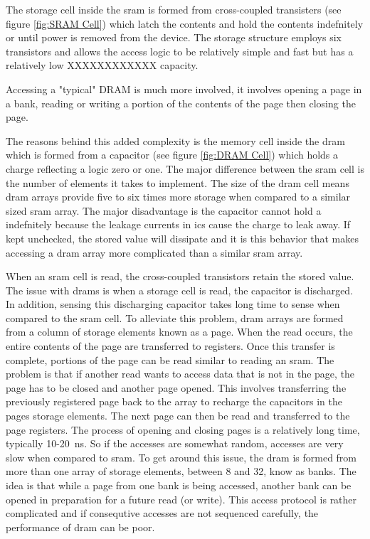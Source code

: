 The storage cell inside the \ac{sram} is formed from cross-coupled transisters (see figure \ref{fig:SRAM Cell}) which latch the contents and hold the contents indefnitely or until power is removed from the device.
The storage structure employs six transistors and allows the access logic to be relatively simple and fast but has a relatively low XXXXXXXXXXXX capacity.

Accessing a "typical" DRAM is much more involved, it involves opening a page in a bank, reading or writing a portion of the contents of the page then closing the page. 

The reasons behind this added complexity is the memory cell inside the \ac{dram} which is formed from a capacitor (see figure \ref{fig:DRAM Cell}) which holds a charge reflecting a logic zero or one. 
The major difference between the \ac{sram} cell is the number of elements it takes to implement. The size of the \ac{dram} cell means \ac{dram} arrays provide five to six times more storage when compared to a similar sized \ac{sram} array.
The major disadvantage is the capacitor cannot hold a indefnitely because the leakage currents in \acp{ic} cause the charge to leak away. If kept unchecked, the stored value will dissipate and it is this behavior that makes accessing a \ac{dram} array more complicated than a similar \ac{sram} array.

When an \ac{sram} cell is read, the cross-coupled transistors retain the stored value. The issue with \acp{dram} is when a storage cell is read, the capacitor is discharged. In addition, sensing this discharging capacitor takes long time to sense when compared to the \ac{sram} cell.
To alleviate this problem, \ac{dram} arrays are formed from a column of storage elements known as a page. When the read occurs, the entire contents of the page are transferred to registers. Once this transfer is complete, portions of the page can be read similar to reading an \ac{sram}. 
The problem is that if another read wants to access data that is not in the page, the page has to be closed and another page opened. This involves transferring the previously registered page back to the array to recharge the capacitors in the pages storage elements. The next page can then be read and transferred to the page registers.
The process of opening and closing pages is a relatively long time, typically 10-20\SI[per-mode=symbol]{}{\nano\second}. So if the accesses are somewhat random, accesses are very slow when compared to \ac{sram}.
To get around this issue, the \ac{dram} is formed from more than one array of storage elements, between 8 and 32, know as banks. The idea is that while a page from one bank is being accessed, another bank can be opened in preparation for a future read (or write).
This access protocol is rather complicated and if consequtive accesses are not sequenced carefully, the performance of \ac{dram} can be poor.

